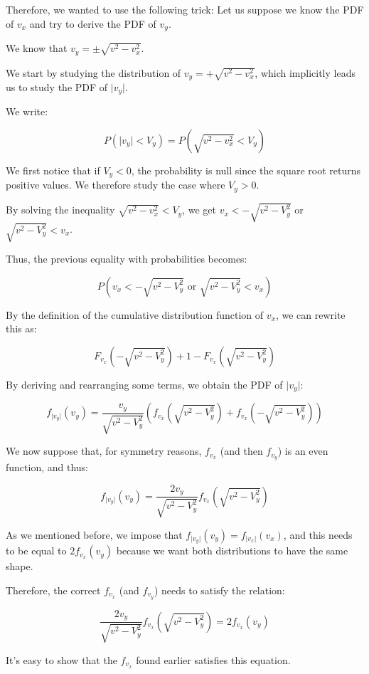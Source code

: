\documentclass{article}
\begin{document}
Therefore, we wanted to use the following trick:
Let us suppose we know the PDF of \(v_x\) and try to derive the PDF of \(v_y\).

We know that \(v_y = \pm \sqrt{v^2 - v_x^2}\).

We start by studying the distribution of \(v_y = + \sqrt{v^2 - v_x^2}\), which implicitly leads us to study the PDF of \(\vert v_y \vert\).

We write:

\[
P(\vert v_y \vert < V_y) = P(\sqrt{v^2 - v_x^2} < V_y)
\]

We first notice that if \(V_y < 0\), the probability is null since the square root returns positive values. We therefore study the case where \(V_y > 0\).

By solving the inequality \(\sqrt{v^2 - v_x^2} < V_y\), we get \(v_x < - \sqrt{v^2 - V_y^2}\) or \(\sqrt{v^2 - V_y^2} < v_x\).

Thus, the previous equality with probabilities becomes:

\[
P(v_x < -\sqrt{v^2 - V_y^2} \text{ or } \sqrt{v^2 - V_y^2} < v_x)
\]

By the definition of the cumulative distribution function of \(v_x\), we can rewrite this as:

\[
F_{v_x}(-\sqrt{v^2 - V_y^2}) + 1 - F_{v_x}(\sqrt{v^2 - V_y^2})
\]

By deriving and rearranging some terms, we obtain the PDF of \(\vert v_y \vert\):

\[
f_{\vert v_y \vert}(v_y) = \frac{v_y}{\sqrt{v^2 - V_y^2}} \left( f_{v_x}(\sqrt{v^2 - V_y^2}) + f_{v_x}(-\sqrt{v^2 - V_y^2}) \right)
\]

We now suppose that, for symmetry reasons, \(f_{v_x}\) (and then \(f_{v_y}\)) is an even function, and thus:

\[
f_{\vert v_y \vert}(v_y) = \frac{2v_y}{\sqrt{v^2 - V_y^2}} f_{v_x}(\sqrt{v^2 - V_y^2})
\]

As we mentioned before, we impose that \(f_{\vert v_y \vert}(v_y) = f_{\vert v_x \vert}(v_x)\), and this needs to be equal to \(2f_{v_x}(v_y)\) because we want both distributions to have the same shape.

Therefore, the correct \(f_{v_x}\) (and \(f_{v_y}\)) needs to satisfy the relation:

\[
\frac{2v_y}{\sqrt{v^2 - V_y^2}} f_{v_x}(\sqrt{v^2 - V_y^2}) = 2 f_{v_x}(v_y)
\]

It's easy to show that the \(f_{v_x}\) found earlier satisfies this equation.
\end{document}
